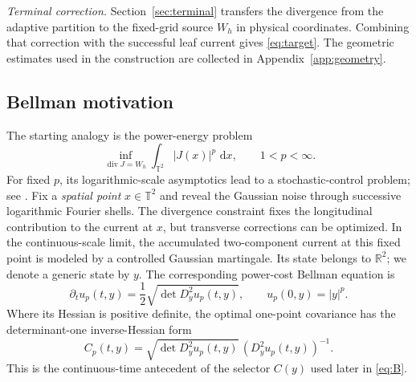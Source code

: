 \documentclass[11pt]{article}
\theoremstyle{definition}
\theoremstyle{remark}
\numberwithin{equation}{section}
\newcommand{\T}{\mathbb T}
\newcommand{\R}{\mathbb R}
\newcommand{\divv}{\operatorname{div}}
\newcommand{\dd}{\,\mathrm d}
\begin{document}
\emph{Terminal correction.}
Section~\ref{sec:terminal} transfers the divergence from the adaptive
partition to the fixed-grid source $W_h$ in physical coordinates.
Combining that correction with the successful leaf current gives
\eqref{eq:target}. The geometric estimates used in the construction
are collected in Appendix~\ref{app:geometry}.

\subsection{Bellman motivation}\label{subsec:bellman-motivation}

The starting analogy is the power-energy problem
\[
 \inf_{\divv J=W_h}\int_{\T^2}|J(x)|^p\,\dd x,
 \qquad 1<p<\infty.
\]
For fixed $p$, its logarithmic-scale asymptotics lead to a
stochastic-control problem; see \cite{umc:AGGT26}. Fix a
\emph{spatial point} $x\in\T^2$ and reveal the Gaussian noise
through successive logarithmic Fourier shells. The divergence
constraint fixes the longitudinal contribution to the current at
$x$, but transverse corrections can be optimized. In the
continuous-scale limit, the accumulated two-component current at
this fixed point is modeled by a controlled Gaussian martingale.
Its state belongs to $\R^2$; we denote a generic state by $y$.
The corresponding power-cost Bellman equation is
\begin{equation}\label{eq:intro-ma}
 \partial_tu_p(t,y)=\frac12\sqrt{\det D_y^2u_p(t,y)},
 \qquad u_p(0,y)=|y|^p.
\end{equation}
Where its Hessian is positive definite, the optimal
one-point covariance has the determinant-one inverse-Hessian form
\[
 C_p(t,y)=\sqrt{\det D_y^2u_p(t,y)}\,
           (D_y^2u_p(t,y))^{-1}.
\]
This is the continuous-time antecedent of the selector $C(y)$
used later in \eqref{eq:B}.
\end{document}
